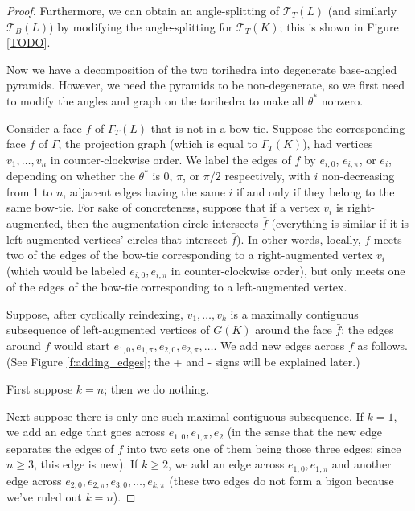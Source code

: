 \documentclass[11pt]{amsart}
\newcommand{\figref}[1]{Figure \ref{#1}}
\newcommand{\sT}{{\mathcal{T}}}
\theoremstyle{plain}
\theoremstyle{definition}
\begin{document}
\begin{proof}
Furthermore, we can obtain an angle-splitting of $\sT_T(L)$
(and similarly $\sT_B(L)$) by modifying the angle-splitting
for $\sT_T(K)$;
this is shown in \figref{TODO}.


Now we have a decomposition of the two torihedra into
degenerate base-angled pyramids.
However, we need the pyramids to be non-degenerate,
so we first need to modify the angles and graph on the torihedra
to make all $\theta^*$ nonzero.


Consider a face $f$ of $\Gamma_T(L)$ that is not in a bow-tie.
Suppose the corresponding face $\bar{f}$ of $\Gamma$,
the projection graph (which is equal to $\Gamma_T(K)$),
had vertices $v_1,\ldots,v_n$ in counter-clockwise order.
We label the edges of $f$ by $e_{i,0}$, $e_{i,\pi}$, or $e_i$,
depending on whether the $\theta^*$ is $0$, $\pi$, or $\pi/2$ respectively,
with $i$ non-decreasing from 1 to $n$,
adjacent edges having the same $i$ if and only if they
belong to the same bow-tie.
For sake of concreteness,
suppose that if a vertex $v_i$ is right-augmented,
then the augmentation circle intersects $\bar{f}$
(everything is similar if it is left-augmented vertices' circles
that intersect $\bar{f}$).
In other words, locally, $f$ meets two of the edges of the bow-tie
corresponding to a right-augmented vertex $v_i$
(which would be labeled $e_{i,0}, e_{i,\pi}$ in counter-clockwise order),
but only meets one of the edges of the bow-tie corresponding to
a left-augmented vertex.


Suppose, after cyclically reindexing, $v_1,\ldots,v_k$
is a maximally contiguous subsequence of left-augmented vertices
of $G(K)$ around the face $\bar{f}$;
the edges around $f$ would start
$e_{1,0}, e_{1,\pi}, e_{2,0}, e_{2,\pi}, \ldots$.
We add new edges across $f$ as follows.
(See \figref{f:adding_edges}; the + and - signs will be explained later.)


First suppose $k=n$; then we do nothing.

Next suppose there is only one such maximal contiguous subsequence.
If $k = 1$, we add an edge that goes across
$e_{1,0},e_{1,\pi},e_2$
(in the sense that the new edge separates the edges of $f$ into two sets
one of them being those three edges;
since $n\geq 3$, this edge is new).
If $k \geq 2$,
we add an edge across $e_{1,0},e_{1,\pi}$
and another edge across $e_{2,0},e_{2,\pi},e_{3,0},\ldots,e_{k,\pi}$
(these two edges do not form a bigon because we've ruled out $k=n$).


\end{proof}
\end{document}
